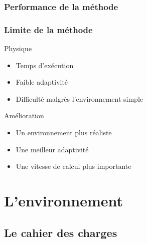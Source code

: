 \documentclass[8pt]{beamer}
\begin{document}
\begin{frame}
\frametitle{Performance de la méthode}
\end{frame}

\begin{frame}
  \frametitle{Limite de la méthode}

  \begin{block}{Physique}
    \begin{itemize}
    \item Temps d'exécution
    \item Faible adaptivité
    \item Difficulté malgrès l'environnement simple
    \end{itemize}
  \end{block}

  \pause

  \begin{block}{Amélioration}
    \begin{itemize}
    \item Un environnement plus réaliste
    \item Une meilleur adaptivité
    \item Une vitesse de calcul plus importante
    \end{itemize}
  \end{block}
  
  
\end{frame}

\section{L'environnement}

\subsection{Le cahier des charges}
\end{document}
